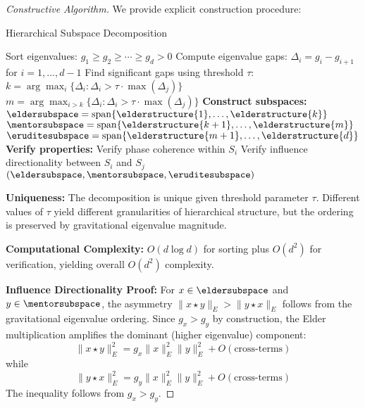 \begin{proof}[Constructive Algorithm]
We provide explicit construction procedure:

\begin{algorithm}[H]
\caption{Hierarchical Subspace Decomposition}
\begin{algorithmic}[1]
    \State Sort eigenvalues: $g_1 \geq g_2 \geq \cdots \geq g_d > 0$
    \State Compute eigenvalue gaps: $\Delta_i = g_i - g_{i+1}$ for $i = 1, \ldots, d-1$
    \State Find significant gaps using threshold $\tau$:
    \State $k = \arg\max_{i} \{\Delta_i : \Delta_i > \tau \cdot \max(\Delta_j)\}$
    \State $m = \arg\max_{i>k} \{\Delta_i : \Delta_i > \tau \cdot \max(\Delta_j)\}$
    \State \textbf{Construct subspaces:}
    \State $\eldersubspace = \mathrm{span}\{\elderstructure{1}, \ldots, \elderstructure{k}\}$
    \State $\mentorsubspace = \mathrm{span}\{\elderstructure{k+1}, \ldots, \elderstructure{m}\}$
    \State $\eruditesubspace = \mathrm{span}\{\elderstructure{m+1}, \ldots, \elderstructure{d}\}$
    \State \textbf{Verify properties:}
        \State Verify phase coherence within $S_i$
        \State Verify influence directionality between $S_i$ and $S_j$
    \EndFor
    \State \Return $(\eldersubspace, \mentorsubspace, \eruditesubspace)$
\EndProcedure
\end{algorithmic}
\end{algorithm}

\textbf{Uniqueness:} The decomposition is unique given threshold parameter $\tau$. Different values of $\tau$ yield different granularities of hierarchical structure, but the ordering is preserved by gravitational eigenvalue magnitude.

\textbf{Computational Complexity:} $O(d \log d)$ for sorting plus $O(d^2)$ for verification, yielding overall $O(d^2)$ complexity.

\textbf{Influence Directionality Proof:} For $x \in \eldersubspace$ and $y \in \mentorsubspace$, the asymmetry $\|x \star y\|_E > \|y \star x\|_E$ follows from the gravitational eigenvalue ordering. Since $g_x > g_y$ by construction, the Elder multiplication amplifies the dominant (higher eigenvalue) component:
\begin{equation}
\|x \star y\|_E^2 = g_x \|x\|_E^2 \|y\|_E^2 + O(\text{cross-terms})
\end{equation}
while 
\begin{equation}
\|y \star x\|_E^2 = g_y \|x\|_E^2 \|y\|_E^2 + O(\text{cross-terms})
\end{equation}
The inequality follows from $g_x > g_y$.
\end{proof}

